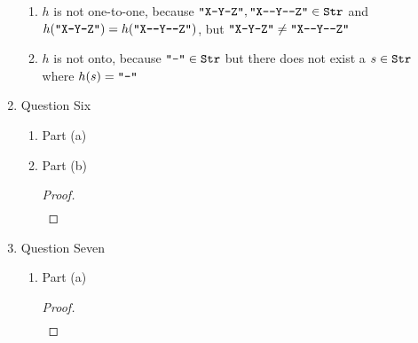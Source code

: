 \documentclass{article}
\begin{document}
\begin{enumerate}
\begin{enumerate}
        \item $h$ is not one-to-one, because $\verb|"X-Y-Z"|, \verb|"X--Y--Z"| \in \verb|Str|$ and $h(\verb|"X-Y-Z"|) = h(\verb|"X--Y--Z"|)$, but $\verb|"X-Y-Z"| \neq \verb|"X--Y--Z"|$
        \item $h$ is not onto, because $\verb|"-"| \in \verb|Str|$ but there does not exist a $s \in \verb|Str|$ where $h(s) = \verb|"-"|$
    \end{enumerate}
    \item Question Six
    \begin{enumerate}
        \item Part (a)
        \item Part (b)
        \begin{proof}
            \begin{align}
                &
            \end{align}
        \end{proof}
    \end{enumerate}
    \item Question Seven
    \begin{enumerate}
        \item Part (a)
        \begin{proof}
            \begin{align}
                &
            \end{align}
        \end{proof}
    \end{enumerate}
\end{enumerate}
\end{document}
